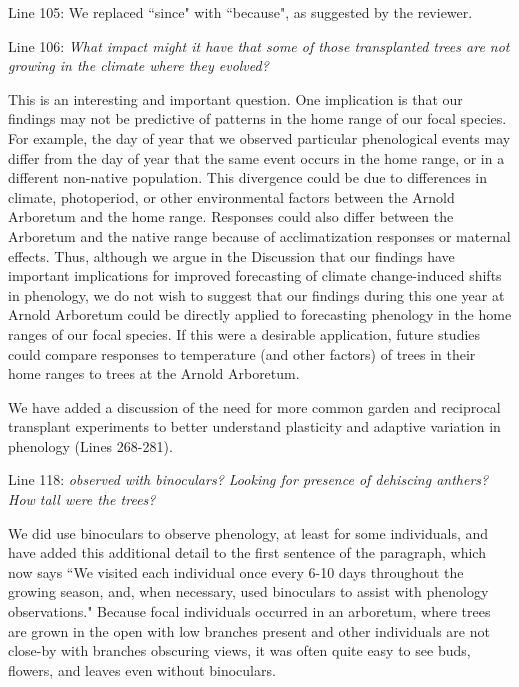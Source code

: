 \documentclass[10.95pt,a4paper]{letter}
\begin{document}
\par Line 105: We replaced ``since" with ``because", as suggested by the reviewer.

\par Line 106: \emph{What impact might it have that some of those transplanted trees are not growing in the climate where they evolved?}
\par This is an interesting and important question. One implication is that our findings may not be predictive of patterns in the home range of our focal species. For example,  the 
day of year that we observed particular phenological events may differ from the day of year that the same event occurs in the home range, or in a different non-native population. This divergence could be due to differences in climate, photoperiod, or other environmental factors between the Arnold Arboretum and the home range. Responses could also differ between the Arboretum and the native range because of acclimatization responses or maternal effects.  Thus, although we argue in the Discussion that our findings have important implications for improved forecasting of climate change-induced shifts in phenology, we do not wish to suggest that our findings during this one year at Arnold Arboretum could be directly applied to forecasting phenology in the home ranges of our focal species. If this were a desirable application, future studies could compare responses to temperature (and other factors) of trees in their home ranges to trees at the Arnold Arboretum. 
\par We have added a discussion of the need for more common garden and reciprocal transplant experiments to better understand plasticity and adaptive variation in phenology (Lines 268-281).

\par Line 118: \emph{observed with binoculars?  Looking for presence of dehiscing anthers? How tall were the trees?}

\par We did use binoculars to observe phenology, at least for some individuals, and have added this additional detail to the first sentence  of the paragraph, which now says  ``We visited each individual once every 6-10 days throughout the growing season, and, when necessary, used binoculars to assist with phenology observations." Because focal individuals occurred in an arboretum, where trees are grown in the open with low branches present and other individuals are not close-by with branches obscuring views,  it was often quite easy to see buds, flowers, and leaves even without binoculars. 
\end{document}
